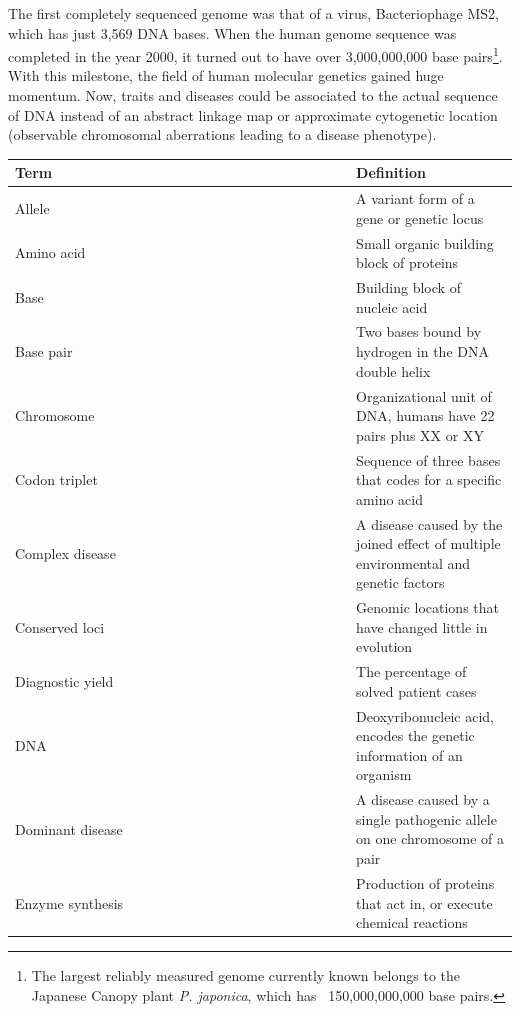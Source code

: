 The first completely sequenced genome was that of a virus, Bacteriophage MS2, which has just 3,569 DNA bases\cite{Fiers_1976}.
When the human genome sequence was completed in the year 2000\cite{Lander_2001}, it turned out to have over 3,000,000,000 base pairs\footnote{The largest reliably measured genome currently known belongs to the Japanese Canopy plant \textsl{P. japonica}, which has ~150,000,000,000 base pairs\cite{Pellicer_2010}.}.
With this milestone, the field of human molecular genetics gained huge momentum.
Now, traits and diseases could be associated to the actual sequence of DNA instead of an abstract linkage map or approximate cytogenetic location (observable chromosomal aberrations leading to a disease phenotype).

\begin{table}
\begin{tabulary}{\linewidth}{LL}
  \mbox{Term~~~~~~~~~~~~~~~~~~~~~~~~~~~~~~~~~~~~} & Definition \\
  \hline
  \rule{0pt}{2.5ex}Allele & A variant form of a gene or genetic locus \\
  \rule{0pt}{2.5ex}Amino acid & Small organic building block of proteins \\
  \rule{0pt}{2.5ex}Base & Building block of nucleic acid \\
  \rule{0pt}{2.5ex}Base pair & Two bases bound by hydrogen in the DNA double helix \\
  \rule{0pt}{2.5ex}Chromosome & Organizational unit of DNA, humans have 22 pairs plus XX or XY \\
  \rule{0pt}{2.5ex}Codon triplet & Sequence of three bases that codes for a specific amino acid \\
  \rule{0pt}{2.5ex}Complex disease & A disease caused by the joined effect of multiple environmental and genetic factors \\
  \rule{0pt}{2.5ex}Conserved loci & Genomic locations that have changed little in evolution \\
  \rule{0pt}{2.5ex}Diagnostic yield & The percentage of solved patient cases \\
  \rule{0pt}{2.5ex}DNA & Deoxyribonucleic acid, encodes the genetic information of an organism \\
  \rule{0pt}{2.5ex}Dominant disease & A disease caused by a single pathogenic allele on one chromosome of a pair \\
  \rule{0pt}{2.5ex}Enzyme synthesis & Production of proteins that act in, or execute chemical reactions \\

\end{tabulary}
\end{table}
